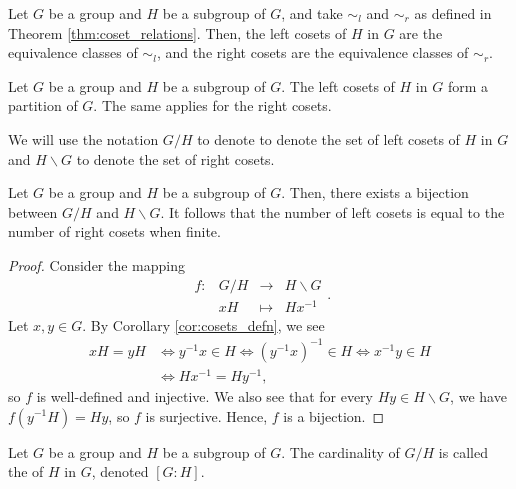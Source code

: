 \begin{cor}\label{cor:cosets_defn}
Let $ G $ be a group and $ H $ be a subgroup of $ G $, and take $ \sim_l $ and $ \sim_r $ as defined in Theorem \ref{thm:coset_relations}. Then, the left cosets of $ H $ in $ G $ are the equivalence classes of $ \sim_l $, and the right cosets are the equivalence classes of $ \sim_r $.
\end{cor}

\begin{cor}\label{cor:cosets_partition}
Let $ G $ be a group and $ H $ be a subgroup of $ G $. The left cosets of $ H $ in $ G $ form a partition of $ G $. The same applies for the right cosets.
\end{cor}

We will use the notation $ G/H $ to denote to denote the set of left cosets of $ H $ in $ G $ and $ H\backslash G $ to denote the set of right cosets.

\begin{prop}
Let $ G $ be a group and $ H $ be a subgroup of $ G $. Then, there exists a bijection between $ G/H $ and $ H\backslash G $. It follows that the number of left cosets is equal to the number of right cosets when finite.
\end{prop}
\begin{proof}
Consider the mapping
\begin{equation*}
    \begin{array}{rccc}
        f: & G/H & \to & H\backslash G \\
        & xH & \mapsto & Hx^{-1}
    \end{array}.
\end{equation*}
Let $ x,y\in G $. By Corollary \ref{cor:cosets_defn}, we see
\begin{align*}
    xH=yH &\iff y^{-1}x\in H \iff (y^{-1}x)^{-1}\in H \iff x^{-1}y\in H \\
    &\iff Hx^{-1}=Hy^{-1},
\end{align*}
so $ f $ is well-defined and injective. We also see that for every $ Hy\in H\backslash G $, we have $ f(y^{-1}H)=Hy $, so $ f $ is surjective. Hence, $ f $ is a bijection.
\end{proof}

\begin{defn}
Let $ G $ be a group and $ H $ be a subgroup of $ G $. The cardinality of $ G/H $ is called the  of $ H $ in $ G $, denoted $ [G:H] $.
\end{defn}

